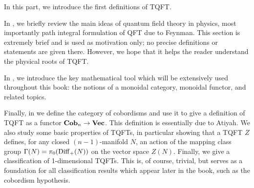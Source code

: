 In this part, we introduce the first definitions
of TQFT.

In , we briefly review the main ideas of quantum
field theory in physics, most importantly path integral formulation of QFT due
to Feynman. This section is extremely brief and is used as motivation only; no
precise definitions or statements are given there. However, we hope that it
helps the reader understand the physical roots of TQFT.

In , we introduce the key mathematical tool which will be
extensively used throughout this book: the notions of a monoidal category,
monoidal functor, and related topics.

Finally, in  we define the category of cobordisms and use it
to give a definition of TQFT as a functor $\mathbf{Cob}_n\to \mathbf{Vec}$. This definition is
essentially due to Atiyah. We also study some basic properties of TQFTs, in
particular showing that a TQFT $Z$ defines, for any closed $(n-1)$-manifold $N$,
an action of the mapping class group $\Gamma(N)=\pi_0(\operatorname{Diff}_+(N))$ on
the vector space $Z(N)$. Finally, we give a classification of 1-dimensional
TQFTs. This is, of course, trivial, but serves as a foundation for all
classification results which appear later in the book, such as the cobordism
hypothesis.